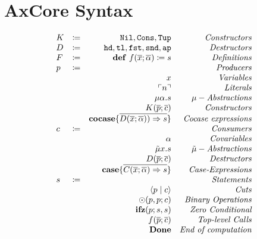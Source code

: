 \documentclass{article}
\newcommand{\lit}[1]{\ensuremath{\ulcorner #1\urcorner}}
\newcommand{\cut}[2]{\ensuremath{\langle #1 \mid #2 \rangle}}
\begin{document}
\section{AxCore Syntax}
\[
\begin{array}{l c r r}
  K & \coloneqq & \mathtt{Nil}, \mathtt{Cons}, \mathtt{Tup} & \emph{Constructors}\\
  D & \coloneqq & \mathtt{hd}, \mathtt{tl}, \mathtt{fst}, \mathtt{snd}, \mathtt{ap} & \emph{Destructors}\\
  F & \coloneqq & \mathbf{def}\ f(\overline{x};\overline{\alpha}) \coloneq s & \emph{Definitions}\\
  p & \coloneqq & & \emph{Producers}\\
  && x & \emph{Variables}\\
  && \lit{n} & \emph{Literals}\\
  && \mu \alpha.s & \mu-\emph{Abstractions}\\
  && K(\overline{p};\overline{c}) & \emph{Constructors}\\
  && \mathbf{cocase} \{ \overline{D(\overline{x};\overline{\alpha})) \Rightarrow s}\} & \emph{Cocase expressions}\\
  c & \coloneqq && \emph{Consumers}\\
  && \alpha & \emph{Covariables}\\
  && \tilde{\mu} x.s & \tilde{\mu}-\emph{Abstractions}\\
  && D(\overline{p};\overline{c}) & \emph{Destructors}\\
  && \mathbf{case} \{ \overline{C(\overline{x};\overline{\alpha}) \Rightarrow s} \} & \emph{Case-Expressions}\\
  s & \coloneqq && \emph{Statements}\\
  && \cut{p}{c} & \emph{Cuts}\\
  && \odot(p,p;c) & \emph{Binary Operations}\\
  && \mathbf{ifz}(p;s,s) & \emph{Zero Conditional}\\
  && f(\overline{p};\overline{c}) & \emph{Top-level Calls} \\
  && \mathbf{Done} & \emph{End of computation}
\end{array}
\]
\end{document}
